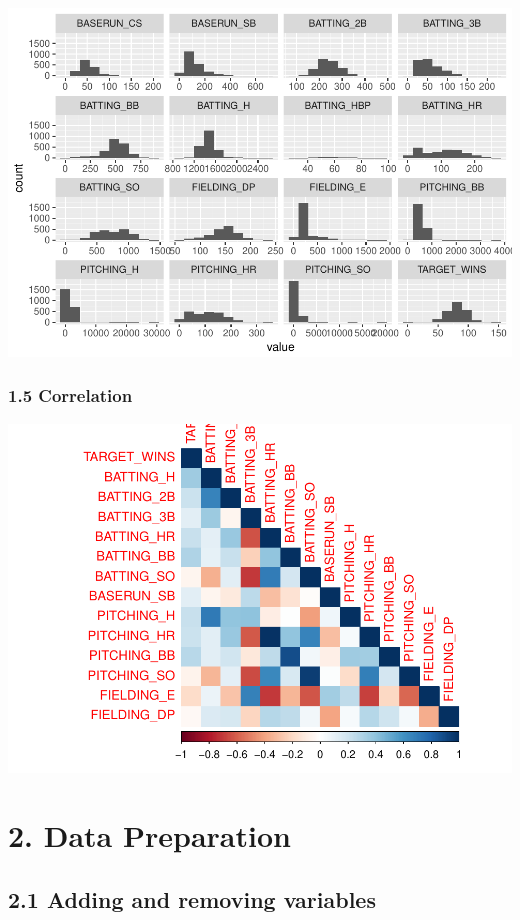 \documentclass[]{article}
\begin{document}
\includegraphics{DATA_621_Homework_1_files/figure-latex/summar-graph-hist-1.pdf}

\subsubsection{1.5 Correlation}\label{correlation}

\includegraphics{DATA_621_Homework_1_files/figure-latex/summary-correlation-1.pdf}

\section{2. Data Preparation}\label{data-preparation}

\subsection{2.1 Adding and removing
variables}\label{adding-and-removing-variables}
\end{document}
